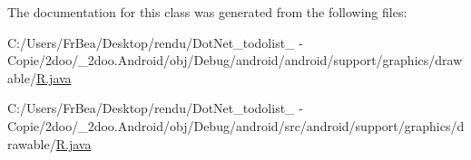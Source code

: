 The documentation for this class was generated from the following files:\begin{CompactItemize}
\item 
C:/Users/FrBea/Desktop/rendu/DotNet\_\-todolist\_ - Copie/2doo/\_\-2doo.Android/obj/Debug/android/android/support/graphics/drawable/\hyperlink{android_2support_2graphics_2drawable_2_r_8java}{R.java}\item 
C:/Users/FrBea/Desktop/rendu/DotNet\_\-todolist\_ - Copie/2doo/\_\-2doo.Android/obj/Debug/android/src/android/support/graphics/drawable/\hyperlink{src_2android_2support_2graphics_2drawable_2_r_8java}{R.java}\end{CompactItemize}
